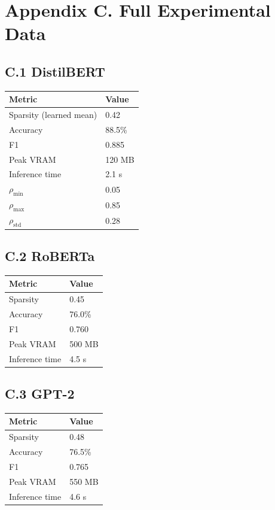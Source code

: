 
\section{Appendix C. Full Experimental Data}

\subsection{C.1 DistilBERT}

\begin{table}[H]
\centering
\small
\begin{tabular}{ll}
\toprule
\textbf{Metric} & \textbf{Value} \\
\midrule
Sparsity (learned mean) & 0.42 \\
Accuracy & 88.5\% \\
F1 & 0.885 \\
Peak VRAM & 120 MB \\
Inference time & 2.1 s \\
$\rho_\text{min}$ & 0.05 \\
$\rho_\text{max}$ & 0.85 \\
$\rho_\text{std}$ & 0.28 \\
\bottomrule
\end{tabular}
\end{table}

\subsection{C.2 RoBERTa}

\begin{table}[H]
\centering
\small
\begin{tabular}{ll}
\toprule
\textbf{Metric} & \textbf{Value} \\
\midrule
Sparsity & 0.45 \\
Accuracy & 76.0\% \\
F1 & 0.760 \\
Peak VRAM & 500 MB \\
Inference time & 4.5 s \\
\bottomrule
\end{tabular}
\end{table}

\subsection{C.3 GPT-2}

\begin{table}[H]
\centering
\small
\begin{tabular}{ll}
\toprule
\textbf{Metric} & \textbf{Value} \\
\midrule
Sparsity & 0.48 \\
Accuracy & 76.5\% \\
F1 & 0.765 \\
Peak VRAM & 550 MB \\
Inference time & 4.6 s \\
\bottomrule
\end{tabular}
\end{table}


